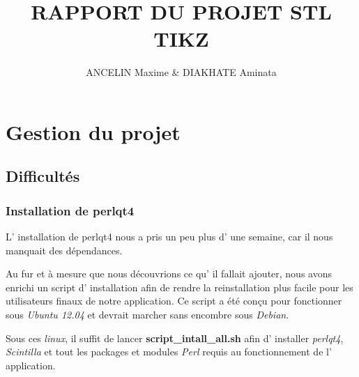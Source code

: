 \documentclass[a4paper]{report}
\title{RAPPORT DU PROJET STL \\ TIKZ}
\author{ANCELIN Maxime & DIAKHATE Aminata}
\begin{document}
 

\newenvironment{violetpar}{\color{violet}}{}
\newenvironment{bluepar}{\par\color{blue}}{\par}
\newenvironment{yellowpar}{\par\color{orange}}{\par}

\renewcommand{\labelitemi}{$\bullet$}

\setcounter{tocdepth}{3}

\tableofcontents
\newpage

\titleformat{\chapter}[hang]{\bf\huge}{\thechapter}{2pc}{} 

\chapter {Gestion du projet}
\section{Difficultés}
\subsection{Installation de perlqt4}
L' installation de perlqt4 nous a pris un peu plus d' une semaine,
car il nous manquait des dépendances.

Au fur et à mesure que nous découvrions ce qu' il fallait ajouter,
nous avons enrichi un script d' installation afin de rendre la reinstallation
plus facile pour les utilisateurs finaux de notre application. Ce
script a été conçu pour fonctionner sous \textit{Ubuntu 12.04} et devrait marcher
sans encombre sous \textit{Debian}.

Sous ces \textit{linux}, il suffit de lancer \textbf{script\_intall\_all.sh}
afin d' installer \textit{perlqt4}, \textit{Scintilla} et tout les packages et modules
\textit{Perl} requis au fonctionnement de l' application.
\end{document}
